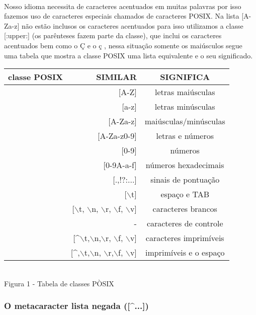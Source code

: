 \documentclass[10pt,a4paper]{article}
\newcommand{\CBarra}{$\backslash$}
\begin{document}
\paragraph*{}
Nosso idioma necessita de caracteres acentuados em muitas palavras por isso fazemos uso de caracteres especiais chamados de caracteres POSIX. Na lista [A-Za-z] não estão inclusos os caracteres acentuados para isso utilizamos a classe [:upper:] (os parênteses fazem parte da classe), que inclui os caracteres acentuados bem como o Ç e o ç , nessa situação somente os maiúsculos segue uma tabela que mostra a classe POSIX uma lista equivalente e o seu significado. \newline
\begin {center}
\begin{tabular}{|l|r|c|} \hline 
classe POSIX & SIMILAR & SIGNIFICA \\ \hline 
[:upper:] & [A-Z] & letras maiúsculas \\ \hline
[:lower:] & [a-z] & letras minúsculas \\ \hline
[:alpha:] & [A-Za-z] & maiúsculas/minúsculas \\ \hline
[:alnum:] & [A-Za-z0-9] & letras e números \\ \hline
[:digit:] & [0-9] & números \\ \hline
[:xdigit:] & [0-9A-a-f] & números hexadecimais \\ \hline
[:punct:] & [.,!?:...] & sinais de pontuação \\ \hline
[:blank:] & [\CBarra t] & espaço e TAB \\ \hline
[:space:] & [\CBarra t, \CBarra n, \CBarra r, \CBarra f, \CBarra v] & caracteres brancos \\ \hline
[:cntrl:] & - & caracteres de controle \\ \hline
[:graph:] & [\textasciicircum \CBarra t,\CBarra n,\CBarra r, \CBarra f, \CBarra v] & caracteres imprimíveis \\ \hline
[:print:] & [\textasciicircum ,\CBarra t,\CBarra n, \CBarra r,\CBarra f, \CBarra v] & imprimíveis e o espaço \\ \hline
\end{tabular} \\ 
Figura 1 - Tabela de classes PÒSIX
\end {center}
\subsubsection{O metacaracter lista negada ([\textasciicircum ...])}
\end{document}
